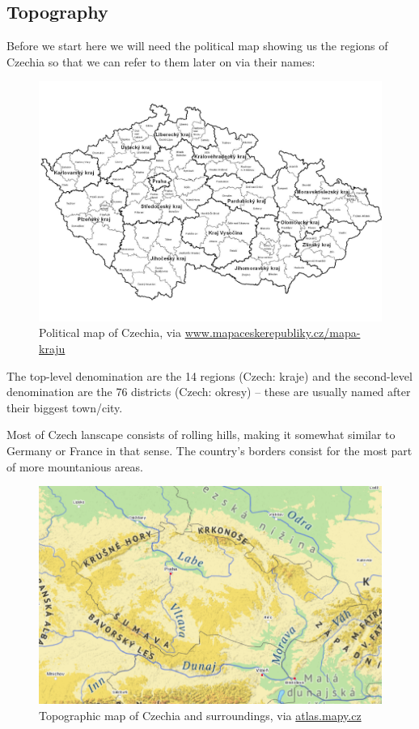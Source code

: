 \documentclass[12pt, oneside]{article}
\begin{document}
\subsection{Topography}
Before we start here we will need the political map showing us the regions of Czechia so that we can refer to them later on via their names:

\begin{figure}[H]
  \includegraphics[width=\textwidth]{polit.jpg}
  \centering
  \caption{Political map of Czechia, via \href{http://www.mapaceskerepubliky.cz/mapa-kraju/}{www.mapaceskerepubliky.cz/mapa-kraju}}
\end{figure}

The top-level denomination are the 14 regions (Czech: kraje) and the second-level denomination are the 76 districts (Czech: okresy) – these are usually named after their biggest town/city. 

Most of Czech lanscape consists of rolling hills, making it somewhat similar to Germany or France in that sense. The country's borders consist for the most part of more mountanious areas.  

\begin{figure}[H]
  \includegraphics[width=\textwidth]{topo.png}
  \centering
  \caption{Topographic map of Czechia and surroundings, via \href{https://atlas.mapy.cz/}{atlas.mapy.cz}}
\end{figure}
\end{document}
